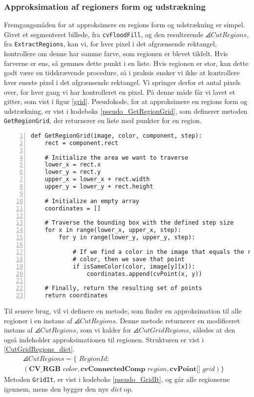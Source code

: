 {\subsubsection{Approksimation af regioners form og udstrækning}
Fremgangsmåden for at approksimere en regions form og udstrækning er
simpel. Givet et segmenteret billede, fra \texttt{cvFloodFill}, og den
resulterende $\angles{CutRegions}$, fra \texttt{ExtractRegions}, kan vi,
for hver pixel i det afgrænsende rektangel, kontrollere om denne har
samme farve, som regionen er blevet tildelt. Hvis farverne er ens, så
gemmes dette punkt i en liste. Hvis regionen er stor, kan dette godt
være en tidskrævende procedure, så i praksis ønsker vi ikke at
kontrollere hver eneste pixel i det afgrænsende rektangel. Vi springer
derfor et antal pixels over, for hver gang vi har kontrolleret en pixel.
På denne måde får vi lavet et gitter, som vist i figur \ref{grid}.
Pseudokode, for at approksimere en regions form og udstrækning, er vist
i kodeboks \ref{pseudo_GetRegionGrid}, som definerer metoden
\texttt{GetRegionGrid}, der returnerer en liste med punkter for en
region.

\begin{lstlisting}[caption={Metode til at approksimere en regions
    form. Bemærk linje 19, hvor der ses et eksempel på det omvendte
    koordinatsystem i \emph{OpenCV}.}, captionpos=b,
    label={pseudo_GetRegionGrid}, frame=tb,
    breaklines=false, float=bh, numbers=left]
def GetRegionGrid(image, color, component, step):
    rect = component.rect

    # Initialize the area we want to traverse
    lower_x = rect.x
    lower_y = rect.y
    upper_x = lower_x + rect.width
    upper_y = lower_y + rect.height

    # Initialize an empty array
    coordinates = []

    # Traverse the bounding box with the defined step size
    for x in range(lower_x, upper_x, step):
        for y in range(lower_y, upper_y, step):

            # If we find a color in the image that equals the region
            # color, then we save that point
            if isSameColor(color, image[y][x]):
                coordinates.append(cvPoint(x, y))

    # Finally, return the resulting set of points
    return coordinates
\end{lstlisting}
Til senere brug, vil vi definere en metode, som finder en approksimation
til alle regioner i en instans af $\angles{CutRegions}$. Denne metode
returnerer en modificeret instans af $\angles{CutRegions}$, som vi
kalder for $\angles{CutGridRegions}$, således at den også indeholder
approksimationen til regionen. Strukturen er vist i
\eqref{CutGridRegions_dict}.
\begin{multline}
    \angles{CutRegions} = \{ \textit{~RegionId} : \\
    (\textbf{CV\_RGB~}\textit{color}, \textbf{cvConnectedComp~}\textit{region}, \textbf{cvPoint[]~}\textit{grid}) \}\quad
    \label{CutGridRegions_dict}
\end{multline}
Metoden \texttt{GridIt}, er vist i kodeboks \ref{pseudo_GridIt}, og går
alle regionerne igennem, mens den bygger den nye \emph{dict} op.

}
